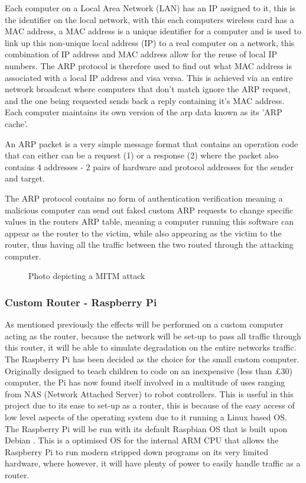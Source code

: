 Each computer on a Local Area Network (LAN) has an IP assigned to it, this is the identifier on the local network, with this each computers wireless card has a MAC address, a MAC address is a unique identifier for a computer and is used to link up this non-unique local address (IP) to a real computer on a network, this combination of IP address and MAC address allow for the reuse of local IP numbers. The ARP protocol is therefore used to find out what MAC address is associated with a local IP address and visa versa. This is achieved via an entire network broadcast where computers that don't match ignore the ARP request, and the one being requested sends back a reply containing it's MAC address. Each computer maintains its own version of the arp data known as its 'ARP cache'.

An ARP packet is a very simple message format that contains an operation code that can either can be a request (1) or a response (2) where the packet also contains 4 addresses - 2 pairs of hardware and protocol addresses for the sender and target.

The ARP protocol contains no form of authentication verification meaning a malicious computer can send out faked custom ARP requests to change specific values in the routers ARP table, meaning a computer running this software can appear as the router to the victim, while also appearing as the victim to the router, thus having all the traffic between the two routed through the attacking computer. 

\begin{center}

	\begin{figure}[h]
		\caption{Photo depicting a MITM attack}
	\end{figure}
\end{center}

\subsubsection{Custom Router - Raspberry Pi}
As mentioned previously the effects will be performed on a custom computer acting as the router, because the network will be set-up to pass all traffic through this router, it will be able to simulate degradation on the entire networks traffic.
The Raspberry Pi \citep{upton2014raspberry} has been decided as the choice for the small custom computer. Originally designed to teach children to code on an inexpensive (less than £30) computer, the Pi has now found itself involved in a multitude of uses ranging from NAS (Network Attached Server) to robot controllers. This is useful in this project due to its ease to set-up as a router, this is because of the easy access of low level aspects of the operating system due to it running a Linux based OS. The Raspberry Pi will be run with its default Raspbian OS \citep{pi2014raspbian} that is built upon Debian \citep{murdock1994overview}. This is a optimised OS for the internal ARM CPU that allows the Raspberry Pi to run modern stripped down programs on its very limited hardware, where however, it will have plenty of power to easily handle traffic as a router.



